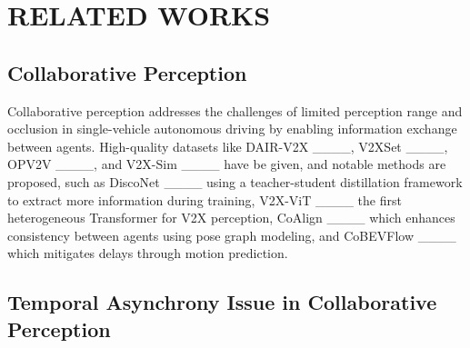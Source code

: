 \section{RELATED WORKS}
\subsection{Collaborative Perception}
Collaborative perception addresses the challenges of limited perception range and occlusion in single-vehicle autonomous driving by enabling information exchange between agents. High-quality datasets like DAIR-V2X ____, V2XSet ____, OPV2V ____, and V2X-Sim ____ have be given, and notable methods are proposed, such as DiscoNet ____ using a teacher-student distillation framework to extract more information during training, V2X-ViT ____ the first heterogeneous Transformer for V2X perception, CoAlign ____ which enhances consistency between agents using pose graph modeling, and CoBEVFlow ____ which mitigates delays through motion prediction.


\subsection{Temporal Asynchrony Issue in Collaborative Perception}


